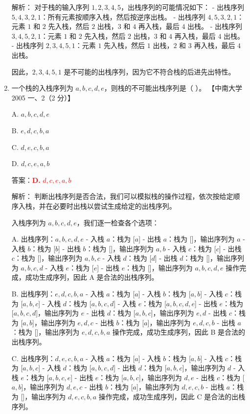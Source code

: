 \documentclass[lang=cn,newtx,10pt,scheme=chinese]{../../../elegantbook}
\begin{document}
\begin{enumerate}
    解析：
    对于栈的输入序列 $1, 2, 3, 4, 5$，出栈序列的可能情况如下：
    - 出栈序列 $5, 4, 3, 2, 1$：所有元素按顺序入栈，然后按逆序出栈。
    - 出栈序列 $4, 5, 3, 2, 1$：元素 $1$ 和 $2$ 先入栈，然后 $2$ 出栈，$3$ 和 $4$ 再入栈，最后 $4$ 出栈。
    - 出栈序列 $3, 4, 5, 2, 1$：元素 $1$ 和 $2$ 先入栈，然后 $2$ 出栈，$3$ 和 $4$ 再入栈，最后 $4$ 出栈。
    - 出栈序列 $2, 3, 4, 5, 1$：元素 $1$ 先入栈，然后 $1$ 出栈，$2$ 和 $3$ 再入栈，最后 $4$ 出栈。

    因此，$2, 3, 4, 5, 1$ 是不可能的出栈序列，因为它不符合栈的后进先出特性。

    \item 一个栈的入栈序列为 $a, b, c, d, e$，则栈的不可能出栈序列是（ ）。  
    【中南大学 2005 一、2（2 分）】  

    A. $a, b, c, d, e$  

    B. $e, d, c, b, a$  

    C. $d, e, c, b, a$  

    D. $d, c, e, a,b$  

    答案：\textcolor{red}{\textbf{D.} $d, c, e, a,b$}

    解析：
    判断出栈序列是否合法，我们可以模拟栈的操作过程，依次按给定顺序入栈，并在必要时出栈以尝试生成给定的出栈序列。

    入栈序列为 $a, b, c, d, e$，我们逐一检查各个选项：

    A. 出栈序列：$a, b, c, d, e$
       - 入栈 $a$：栈为 [$a$]
       - 出栈 $a$：栈为 []，输出序列为 $a$
       - 入栈 $b$：栈为 [$b$]
       - 出栈 $b$：栈为 []，输出序列为 $a, b$
       - 入栈 $c$：栈为 [$c$]
       - 出栈 $c$：栈为 []，输出序列为 $a, b, c$
       - 入栈 $d$：栈为 [$d$]
       - 出栈 $d$：栈为 []，输出序列为 $a, b, c, d$
       - 入栈 $e$：栈为 [$e$]
       - 出栈 $e$：栈为 []，输出序列为 $a, b, c, d, e$
       操作完成，成功生成序列，因此 A 是合法的出栈序列。

    B. 出栈序列：$e, d, c, b, a$
       - 入栈 $a$：栈为 [$a$]
       - 入栈 $b$：栈为 [$a, b$]
       - 入栈 $c$：栈为 [$a, b, c$]
       - 入栈 $d$：栈为 [$a, b, c, d$]
       - 入栈 $e$：栈为 [$a, b, c, d, e$]
       - 出栈 $e$：栈为 [$a, b, c, d$]，输出序列为 $e$
       - 出栈 $d$：栈为 [$a, b, c$]，输出序列为 $e, d$
       - 出栈 $c$：栈为 [$a, b$]，输出序列为 $e, d, c$
       - 出栈 $b$：栈为 [$a$]，输出序列为 $e, d, c, b$
       - 出栈 $a$：栈为 []，输出序列为 $e, d, c, b, a$
       操作完成，成功生成序列，因此 B 是合法的出栈序列。

    C. 出栈序列：$d, e, c, b, a$
       - 入栈 $a$：栈为 [$a$]
       - 入栈 $b$：栈为 [$a, b$]
       - 入栈 $c$：栈为 [$a, b, c$]
       - 入栈 $d$：栈为 [$a, b, c, d$]
       - 出栈 $d$：栈为 [$a, b, c$]，输出序列为 $d$
       - 入栈 $e$：栈为 [$a, b, c, e$]
       - 出栈 $e$：栈为 [$a, b, c$]，输出序列为 $d, e$
       - 出栈 $c$：栈为 [$a, b$]，输出序列为 $d, e, c$
       - 出栈 $b$：栈为 [$a$]，输出序列为 $d, e, c, b$
       - 出栈 $a$：栈为 []，输出序列为 $d, e, c, b, a$
       操作完成，成功生成序列，因此 C 是合法的出栈序列。


\end{enumerate}
\end{document}
